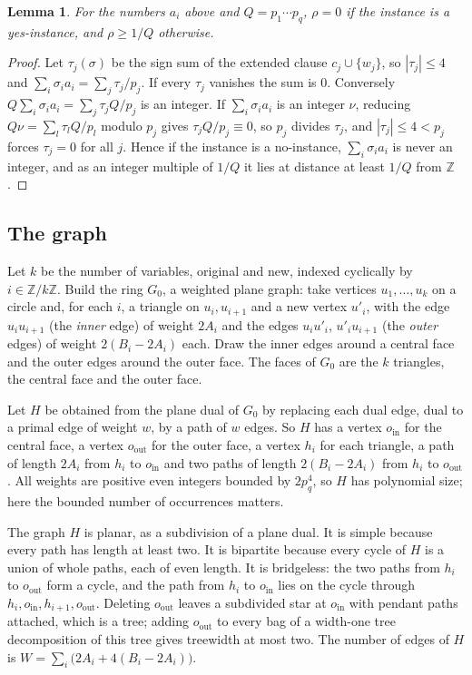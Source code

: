 \documentclass[11pt]{amsart}
\newtheorem{lem}[thm]{Lemma}
\theoremstyle{definition}
\theoremstyle{remark}
\numberwithin{equation}{section}
\newcommand{\Z}{\mathbb Z}
\begin{document}
\begin{lem}\label{lem:signed}
For the numbers $a_i$ above and $Q=p_1\cdots p_q$, $\rho=0$ if the instance is a yes-instance, and $\rho\ge1/Q$ otherwise.
\end{lem}

\begin{proof}
Let $\tau_j(\sigma)$ be the sign sum of the extended clause $c_j\cup\{w_j\}$, so $|\tau_j|\le4$ and $\sum_i\sigma_ia_i=\sum_j\tau_j/p_j$. If every $\tau_j$ vanishes the sum is $0$. Conversely $Q\sum_i\sigma_ia_i=\sum_j\tau_jQ/p_j$ is an integer. If $\sum_i\sigma_ia_i$ is an integer $\nu$, reducing $Q\nu=\sum_l\tau_lQ/p_l$ modulo $p_j$ gives $\tau_jQ/p_j\equiv0$, so $p_j$ divides $\tau_j$, and $|\tau_j|\le4<p_j$ forces $\tau_j=0$ for all $j$. Hence if the instance is a no-instance, $\sum_i\sigma_ia_i$ is never an integer, and as an integer multiple of $1/Q$ it lies at distance at least $1/Q$ from $\Z$.
\end{proof}

\subsection{The graph}
Let $k$ be the number of variables, original and new, indexed cyclically by $i\in\Z/k\Z$. Build the ring $G_0$, a weighted plane graph: take vertices $u_1,\dots,u_k$ on a circle and, for each $i$, a triangle on $u_i,u_{i+1}$ and a new vertex $u'_i$, with the edge $u_iu_{i+1}$ (the \emph{inner} edge) of weight $2A_i$ and the edges $u_iu'_i$, $u'_iu_{i+1}$ (the \emph{outer} edges) of weight $2(B_i-2A_i)$ each. Draw the inner edges around a central face and the outer edges around the outer face. The faces of $G_0$ are the $k$ triangles, the central face and the outer face.

Let $H$ be obtained from the plane dual of $G_0$ by replacing each dual edge, dual to a primal edge of weight $w$, by a path of $w$ edges. So $H$ has a vertex $o_{\mathrm{in}}$ for the central face, a vertex $o_{\mathrm{out}}$ for the outer face, a vertex $h_i$ for each triangle, a path of length $2A_i$ from $h_i$ to $o_{\mathrm{in}}$ and two paths of length $2(B_i-2A_i)$ from $h_i$ to $o_{\mathrm{out}}$. All weights are positive even integers bounded by $2p_q^4$, so $H$ has polynomial size; here the bounded number of occurrences matters.

The graph $H$ is planar, as a subdivision of a plane dual. It is simple because every path has length at least two. It is bipartite because every cycle of $H$ is a union of whole paths, each of even length. It is bridgeless: the two paths from $h_i$ to $o_{\mathrm{out}}$ form a cycle, and the path from $h_i$ to $o_{\mathrm{in}}$ lies on the cycle through $h_i,o_{\mathrm{in}},h_{i+1},o_{\mathrm{out}}$. Deleting $o_{\mathrm{out}}$ leaves a subdivided star at $o_{\mathrm{in}}$ with pendant paths attached, which is a tree; adding $o_{\mathrm{out}}$ to every bag of a width-one tree decomposition of this tree gives treewidth at most two. The number of edges of $H$ is $W=\sum_i\bigl(2A_i+4(B_i-2A_i)\bigr)$.
\end{document}
